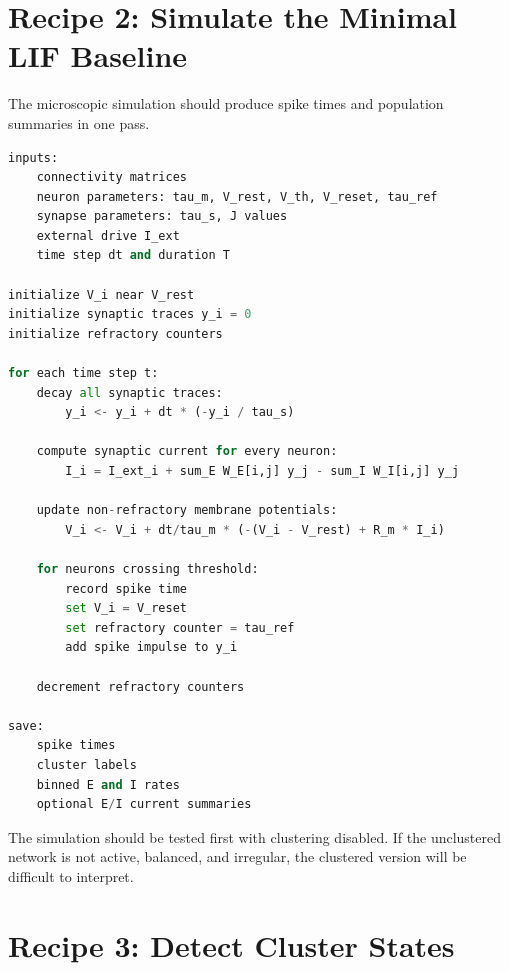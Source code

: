 \section{Recipe 2: Simulate the Minimal LIF Baseline}
\label{app:recipe-simulate-lif-baseline}

The microscopic simulation should produce spike times and population summaries in one pass.

\begin{lstlisting}[language=Python,caption={Pseudocode for a current-based LIF simulation.}]
inputs:
    connectivity matrices
    neuron parameters: tau_m, V_rest, V_th, V_reset, tau_ref
    synapse parameters: tau_s, J values
    external drive I_ext
    time step dt and duration T

initialize V_i near V_rest
initialize synaptic traces y_i = 0
initialize refractory counters

for each time step t:
    decay all synaptic traces:
        y_i <- y_i + dt * (-y_i / tau_s)

    compute synaptic current for every neuron:
        I_i = I_ext_i + sum_E W_E[i,j] y_j - sum_I W_I[i,j] y_j

    update non-refractory membrane potentials:
        V_i <- V_i + dt/tau_m * (-(V_i - V_rest) + R_m * I_i)

    for neurons crossing threshold:
        record spike time
        set V_i = V_reset
        set refractory counter = tau_ref
        add spike impulse to y_i

    decrement refractory counters

save:
    spike times
    cluster labels
    binned E and I rates
    optional E/I current summaries
\end{lstlisting}

The simulation should be tested first with clustering disabled. If the unclustered network is not active, balanced, and irregular, the clustered version will be difficult to interpret.

\section{Recipe 3: Detect Cluster States}
\label{app:recipe-detect-cluster-states}

